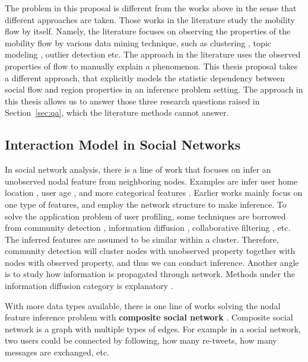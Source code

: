 The problem in this proposal is different from the works above in the sense that different approaches are taken. Those works in the literature study the mobility flow by itself. Namely, the literature focuses on observing the properties of the mobility flow by various data mining technique, such as clustering \cite{berlingerio2013allaboard}, topic modeling \cite{yuan2012discovering}, outlier detection \cite{zheng2011urban} etc.  The approach in the literature uses the observed properties of flow to manually explain a phenomenon. This thesis proposal takes a different approach, that explicitly models the statistic dependency between social flow and region properties in an inference problem setting. The approach in this thesis allows us to answer those three research questions raised in Section~\ref{sec:qa}, which the literature methods cannot answer.





\subsection{Interaction Model in Social Networks}


In social network analysis, there is a line of work that focuses on infer an unobserved  nodal feature from neighboring nodes. Examples are infer user home location \cite{Pontes:2012:WKY:2370216.2370419, Li:2012:TSU:2339530.2339692}, user age \cite{6195711}, and more categorical features \cite{Mislove:2010:YYK:1718487.1718519}. Earlier works mainly focus on one type of features, and employ the network structure to make inference. To solve the application problem of user profiling, some techniques are borrowed from community detection \cite{fortunato2010community}, information diffusion \cite{guille2013information}, collaborative filtering \cite{breese1998empirical}, etc. The inferred features are assumed to be similar within a cluster. Therefore, community detection will cluster nodes with unobserved property together with nodes with observed property, and thus we can conduct inference. Another angle is to study how information is propagated through network. Methods under the information diffusion category is explanatory \cite{rodriguez2011uncovering, gomez2010inferring}.


With more data types available, there is one line of works solving the nodal feature inference problem with \textbf{composite social network} \cite{pan2011composite, madan2011pervasive,zhong2012comsoc}. Composite social network is a graph with multiple types of edges. For example in a social network, two users could be connected by following, how many re-tweets, how many messages are exchanged, etc. 


